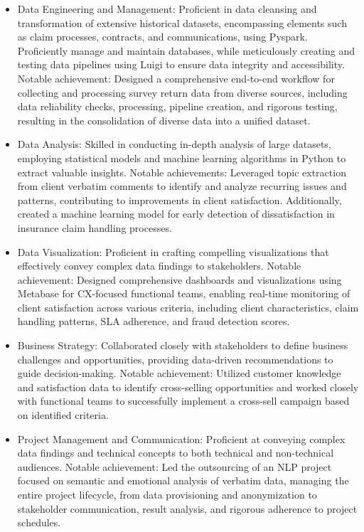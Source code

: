 \documentclass[10pt,letter,ragged2e,withhyper]{altacv}
\begin{document}
\begin{paracol}{2}



\begin{itemize}
  \item Data Engineering and Management: Proficient in data cleansing and transformation of extensive historical datasets, encompassing elements such as claim processes, contracts, and communications, using Pyspark. Proficiently manage and maintain databases, while meticulously creating and testing data pipelines using Luigi to ensure data integrity and accessibility. Notable achievement: Designed a comprehensive end-to-end workflow for collecting and processing survey return data from diverse sources, including data reliability checks, processing, pipeline creation, and rigorous testing, resulting in the consolidation of diverse data into a unified dataset.
  \item Data Analysis: Skilled in conducting in-depth analysis of large datasets, employing statistical models and machine learning algorithms in Python to extract valuable insights. Notable achievements: Leveraged topic extraction from client verbatim comments to identify and analyze recurring issues and patterns, contributing to improvements in client satisfaction. Additionally, created a machine learning model for early detection of dissatisfaction in insurance claim handling processes.
  \item Data Visualization: Proficient in crafting compelling visualizations that effectively convey complex data findings to stakeholders. Notable achievement: Designed comprehensive dashboards and visualizations using Metabase for CX-focused functional teams, enabling real-time monitoring of client satisfaction across various criteria, including client characteristics, claim handling patterns, SLA adherence, and fraud detection scores.
  \item Business Strategy: Collaborated closely with stakeholders to define business challenges and opportunities, providing data-driven recommendations to guide decision-making. Notable achievement: Utilized customer knowledge and satisfaction data to identify cross-selling opportunities and worked closely with functional teams to successfully implement a cross-sell campaign based on identified criteria.
  \item Project Management and Communication: Proficient at conveying complex data findings and technical concepts to both technical and non-technical audiences. Notable achievement: Led the outsourcing of an NLP project focused on semantic and emotional analysis of verbatim data, managing the entire project lifecycle, from data provisioning and anonymization to stakeholder communication, result analysis, and rigorous adherence to project schedules.
\end{itemize}


\end{paracol}
\end{document}
